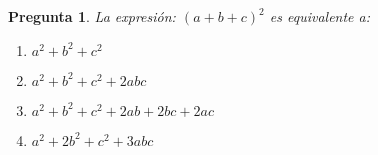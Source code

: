 \documentclass{article}
\newtheorem {Pregunta}{Pregunta}
\newenvironment{pregunta}{\begin{Pregunta} \rm}{\rm\end{Pregunta}}
\newenvironment{opciones}{\begin{enumerate}
    \renewcommand{\theenumi}{\Alph{enumi}}}
{\end{enumerate}\renewcommand{\theenumi}{\roman{enumi}}}
\begin{document}
\begin{pregunta}
La expresi\'on:
$(a+b+c)^2$ es equivalente a:

\begin{opciones}
\item $a^2+b^2+c^2$  %
\item $a^2+b^2+c^2+2abc$
\item $a^2+b^2+c^2+2ab+2bc+2ac$      
\item $a^2+2b^2+c^2+3abc$ 
\end{opciones}

\end{pregunta}
\end{document}
